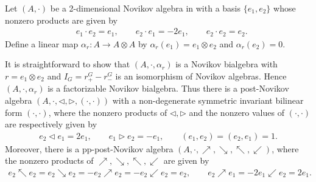 \documentclass[12pt]{amsart}
\begin{document}
\begin{example}\label{ex2n}
    Let $(A,\cdot)$ be a 2-dimensional Novikov algebra in \cite{BM} with a basis $\{e_1,e_2 \}$ whose nonzero products are given by
    \begin{align*}
        &e_1\cdot e_2=e_1,\qquad e_2\cdot e_1=-2e_1,\qquad e_2\cdot e_2=e_2.
    \end{align*}
    Define a linear map $\alpha_r: A\rightarrow A\otimes A$ by  $\alpha_r (e_1)=e_1\otimes e_2$ and $ \alpha_r(e_2)=0$.

    It is straightforward  to show that $(A,\cdot,\alpha_r)$ is a Novikov bialgebra with $r=e_1\otimes e_2$ and $I_G=r^G_+-r^G_-$ is an isomorphism of Novikov algebras. Hence $(A,\cdot,\alpha_r)$ is a factorizable Novikov bialgebra.
    Thus there is a   post-Novikov algebra $(A,\cdot,\lhd,\rhd,(\cdot,\cdot))$
    with a non-degenerate symmetric invariant bilinear form $(\cdot,\cdot)$, where the nonzero products of
    $\lhd,\rhd$ and the nonzero values of $(\cdot,\cdot)$  are  respectively given by
    \begin{align*}
       e_2\lhd e_1=2e_1,  \qquad  e_1\rhd e_2=-e_1,\qquad (e_1,e_2)=(e_2,e_1)=1.
    \end{align*}
Moreover, there is a pp-post-Novikov algebra
$(A,\cdot,\nearrow,\searrow,\nwarrow,\swarrow)$, where the nonzero
products of  $\nearrow,\searrow,\nwarrow,\swarrow$ are given by
    \begin{align*}
        e_2\nwarrow e_2=e_2 \searrow e_2=-e_2\nearrow e_2=-e_2\swarrow e_2=e_2,\qquad e_2\nearrow e_1=-2e_1\swarrow e_2=2e_1.
    \end{align*}


\end{example}
\end{document}
